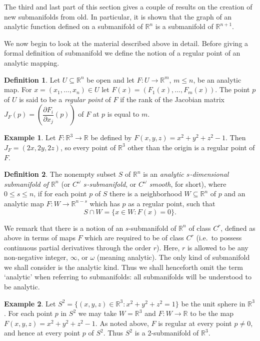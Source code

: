 \documentclass[11pt]{article}
\theoremstyle{plain}
\theoremstyle{definition}
\newtheorem*{definition}{Definition}
\newtheorem*{example}{Example}
\newcommand{\R}{\mathbb{R}}
\begin{document}
The third and last part of this section gives a couple of results on the
creation of new submanifolds from old. In particular, it is shown that
the graph of an analytic function defined on a submanifold of $\R^n$ is
a submanifold of $\R^{n+1}$.

We now begin to look at the material described above in detail. Before
giving a formal definition of submanifold we define the notion of a
regular point of an analytic mapping.

\begin{definition}
Let $U \subseteq \R^n$ be open and let $F: U \to \R^m$, $m \le n$, be an
analytic map. For $x = (x_1, \ldots, x_n) \in U$ let
$F(x) = (F_1(x), \ldots, F_m(x))$. The point $p$ of $U$ is said to be a
\emph{regular point} of $F$ if the rank of the Jacobian matrix
$J_F(p) = \left(\dfrac{\partial F_i}{\partial x_j}(p)\right)$ of $F$ at
$p$ is equal to $m$.
\end{definition}

\begin{example}
Let $F: \R^3 \to \R$ be defined by $F(x, y, z) = x^2 + y^2 + z^2 - 1$.
Then $J_F = (2x, 2y, 2z)$, so every point of $\R^3$ other than the
origin is a regular point of $F$.
\end{example}

\begin{definition}
The nonempty subset $S$ of $\R^n$ is an \emph{analytic $s$-dimensional
submanifold of $\R^n$} (or \emph{$C^\omega$ $s$-submanifold}, or
\emph{$C^\omega$ smooth}, for short), where $0 \le s \le n$, if for
each point $p$ of $S$ there is a neighborhood $W \subseteq \R^n$ of $p$
and an analytic map $F: W \to \R^{n-s}$ which has $p$ as a regular
point, such that
\[
S \cap W = \{ x \in W : F(x) = 0 \}.
\]
\end{definition}

We remark that there is a notion of an $s$-submanifold of $\R^n$ of
class $C^r$, defined as above in terms of maps $F$ which are required
to be of class $C^r$ (i.e.\ to possess continuous partial derivatives
through the order $r$). Here, $r$ is allowed to be any non-negative
integer, $\infty$, or $\omega$ (meaning analytic). The only kind of
submanifold we shall consider is the analytic kind. Thus we shall
henceforth omit the term `analytic' when referring to submanifolds: all
submanifolds will be understood to be analytic.

\begin{example}
Let $S^2 = \{ (x, y, z) \in \R^3 : x^2 + y^2 + z^2 = 1 \}$ be the unit
sphere in $\R^3$. For each point $p$ in $S^2$ we may take $W = \R^3$ and
$F: W \to \R$ to be the map $F(x, y, z) = x^2 + y^2 + z^2 - 1$. As
noted above, $F$ is regular at every point $p \ne 0$, and hence at
every point $p$ of $S^2$. Thus $S^2$ is a 2-submanifold of $\R^3$.
\end{example}
\end{document}
